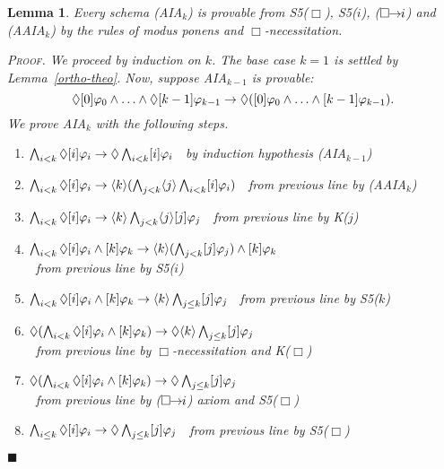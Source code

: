 \documentclass{article}
\newtheorem{lemma}{Lemma}
\newenvironment{pf}{\em \medskip\noindent \textsc{Proof.}}
{\hspace*{\fill}\nolinebreak[2]\hspace*{\fill}$\blacksquare$\medskip}
\renewcommand{\phi}{\varphi}
\newcommand{\cstit}[1]{[{#1}]}           \newcommand{\poscstit}[1]{\langle {#1} \rangle}    \newcommand{\dstit}[2]{[{#1}\ \mathit{dstit}\! :{#2}]}
\newcommand{\InclBox}[1]{$\Box \!\! \imp \!\! #1$}
\begin{document}
\begin{lemma}
\label{provable-lemma}
Every schema (AIA$_k$) is provable from
S5($\Box$), S5($i$), (\InclBox{i})
and (AAIA$_k$)
by the rules of modus ponens and $\Box$-necessitation.

\begin{pf}
We proceed by induction on $k$. The base case $k = 1$ is settled
by \mbox{Lemma \ref{ortho-theo}}. Now, suppose AIA$_{k-1}$ is
provable:
$$\Diamond\cstit{0}\phi_0 \land
                   \ldots \land \Diamond\cstit{k-1}\phi_{k-1} \imp
   \Diamond(\cstit{0}\phi_0 \land \ldots \land \cstit{k-1}\phi_{k-1}).$$
We prove AIA$_k$ with the following steps.
\begin{enumerate}
\item $\bigwedge_{i < k}\Diamond\cstit{i}\phi_i \imp
\Diamond\bigwedge_{i < k}\cstit{i}\phi_i$ $~$ \hfill by induction
hypothesis (AIA$_{k-1}$)
\item $\bigwedge_{i < k}\Diamond\cstit{i}\phi_i \imp
\poscstit{k}(\bigwedge_{j <
k}\poscstit{j}\bigwedge_{i<k}\cstit{i}\phi_i)$ $~$ \hfill from
previous line by (AAIA$_{k}$)
\item $\bigwedge_{i < k}\Diamond\cstit{i}\phi_i \imp
\poscstit{k}\bigwedge_{j < k}\poscstit{j}\cstit{j}\phi_j$ $~$
\hfill from previous line by K($j$)
\item $\bigwedge_{i < k}\Diamond\cstit{i}\phi_i \land
                   \cstit{k}\phi_k     \imp
\poscstit{k}(\bigwedge_{j < k}\cstit{j}\phi_j)
                   \land \cstit{k}\phi_k$\\
$~$ \hfill from previous line by S5($i$)
\item $\bigwedge_{i < k}\Diamond\cstit{i}\phi_i \land
                   \cstit{k}\phi_k     \imp
\poscstit{k}\bigwedge_{j \leq k}\cstit{j}\phi_j $ $~$ \hfill from
previous line by S5($k$)
\item $\Diamond(\bigwedge_{i < k}\Diamond\cstit{i}\phi_i \land
                   \cstit{k}\phi_k)     \imp
\Diamond\poscstit{k}\bigwedge_{j \leq k}\cstit{j}\phi_j $\\
$~$ \hfill from previous line by $\Box$-necessitation and K($\Box$)
\item $\Diamond(\bigwedge_{i < k}\Diamond\cstit{i}\phi_i \land
                   \cstit{k}\phi_k)     \imp
\Diamond\bigwedge_{j \leq k}\cstit{j}\phi_j $\\
$~$ \hfill from previous line by (\InclBox{i}) axiom and S5($\Box$)
\item $\bigwedge_{i \leq k}\Diamond\cstit{i}\phi_i \imp
\Diamond\bigwedge_{j \leq k}\cstit{j}\phi_j $ $~$ \hfill from
previous line by S5($\Box$)
\end{enumerate}

\end{pf}

\end{lemma}
\end{document}

